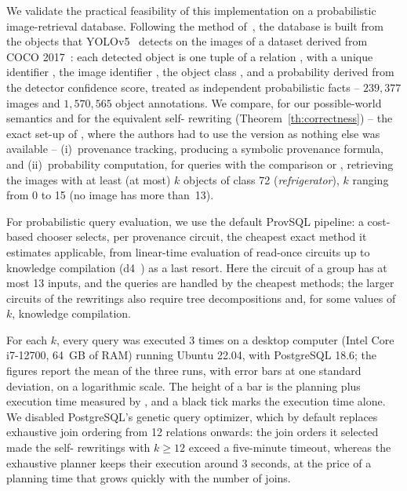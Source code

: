 We validate the practical feasibility of this implementation on a
probabilistic image-retrieval database. Following the method
of~\cite{yunus2025using}, the database is built from the objects that
YOLOv5~\cite{ultralytics2021yolov5} detects on the images of a dataset
derived from COCO 2017~\cite{lin2014microsoft}: each detected object is
one tuple of a relation , with a unique identifier
, the image identifier , the object class ,
and a probability derived from the detector confidence score, treated as
independent probabilistic facts -- $239{,}377$ images and $1{,}570{,}565$
object annotations. We compare, for our possible-world semantics and for
the equivalent self- rewriting (Theorem~\ref{th:correctness})
-- the exact set-up of \cite{yunus2025using}, where the authors had to
use the  version as nothing else was available --
(i)~provenance tracking, producing a symbolic provenance formula, and
(ii)~probability computation, for  queries with the
comparison  or , retrieving the
images with at least (at most) $k$ objects of class 72
(\emph{refrigerator}), $k$ ranging from 0 to 15 (no image has more
than~13).

For probabilistic query evaluation, we use the default ProvSQL pipeline:
a cost-based chooser selects, per provenance circuit, the cheapest exact
method it estimates applicable, from linear-time evaluation of read-once
circuits up to knowledge compilation
(d4~\cite{DBLP:conf/ijcai/LagniezM17}) as a last resort. Here the
circuit of a group has at most 13 inputs, and the  queries
are handled by the cheapest methods; the larger circuits of the
 rewritings also require tree decompositions and, for some
values of~$k$, knowledge compilation.

For each $k$, every query was executed $3$ times on a desktop computer
(Intel Core i7-12700, 64~GB of RAM) running Ubuntu 22.04, with PostgreSQL
18.6; the figures report the mean of the three runs, with error bars at
one standard deviation, on a logarithmic scale. The height of a bar is
the planning plus execution time measured by , and
a black tick marks the execution time alone. We disabled PostgreSQL's
genetic query optimizer, which by default replaces exhaustive join
ordering from 12 relations onwards: the join orders it selected made the
self- rewritings with $k\geq 12$ exceed a five-minute timeout,
whereas the exhaustive planner keeps their execution around $3$ seconds,
at the price of a planning time that grows quickly with the number of
joins.

